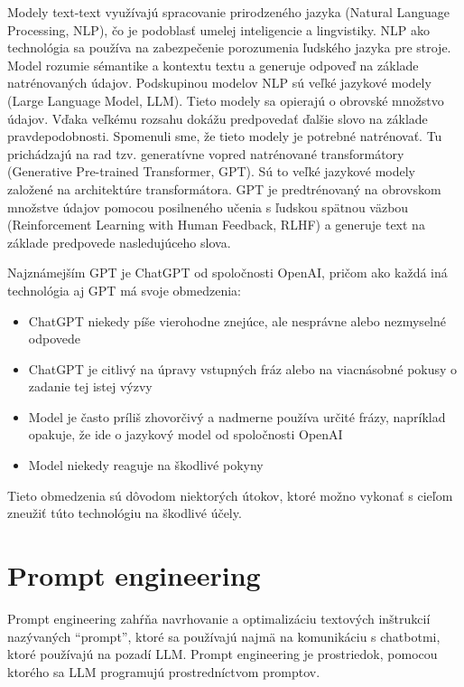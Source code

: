 Modely text-text využívajú spracovanie prirodzeného jazyka (Natural Language Processing, NLP), čo je podoblasť umelej inteligencie a lingvistiky. NLP ako technológia sa používa na zabezpečenie porozumenia ľudského jazyka pre stroje. Model rozumie sémantike a kontextu textu a generuje odpoveď na základe natrénovaných údajov. Podskupinou modelov NLP sú veľké jazykové modely (Large Language Model, LLM). Tieto modely sa opierajú o obrovské množstvo údajov. Vďaka veľkému rozsahu dokážu predpovedať ďalšie slovo na základe pravdepodobnosti. Spomenuli sme, že tieto modely je potrebné natrénovať. Tu prichádzajú na rad tzv. generatívne vopred natrénované transformátory (Generative Pre-trained Transformer, GPT). Sú to veľké jazykové modely založené na architektúre transformátora. GPT je predtrénovaný na obrovskom množstve údajov pomocou posilneného učenia s ľudskou spätnou väzbou (Reinforcement Learning with Human Feedback, RLHF) a generuje text na základe predpovede nasledujúceho slova.

Najznámejším GPT je ChatGPT od spoločnosti OpenAI, pričom ako každá iná technológia aj GPT má svoje obmedzenia:

\begin{itemize}
    \item ChatGPT niekedy píše vierohodne znejúce, ale nesprávne alebo nezmyselné odpovede
    \item ChatGPT je citlivý na úpravy vstupných fráz alebo na viacnásobné pokusy o zadanie tej istej výzvy
    \item Model je často príliš zhovorčivý a nadmerne používa určité frázy, napríklad opakuje, že ide o jazykový model od spoločnosti OpenAI
    \item Model niekedy reaguje na škodlivé pokyny
\end{itemize}

Tieto obmedzenia sú dôvodom niektorých útokov, ktoré možno vykonať s cieľom zneužiť túto technológiu na škodlivé účely.

\section*{Prompt engineering \label{sec:prompt_engineering_resume}}

Prompt engineering zahŕňa navrhovanie a optimalizáciu textových inštrukcií nazývaných ``prompt'', ktoré sa používajú najmä na komunikáciu s chatbotmi, ktoré používajú na pozadí LLM. Prompt engineering je prostriedok, pomocou ktorého sa LLM programujú prostredníctvom promptov.

